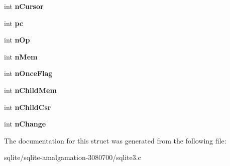 \begin{DoxyCompactItemize}
\item 
\hypertarget{struct_vdbe_frame_a9b74ca630c19ab905db3be4e78dbd9e1}{int {\bfseries n\+Cursor}}\label{struct_vdbe_frame_a9b74ca630c19ab905db3be4e78dbd9e1}

\item 
\hypertarget{struct_vdbe_frame_aed0e6d8cb1908580a3c2aca04516b46c}{int {\bfseries pc}}\label{struct_vdbe_frame_aed0e6d8cb1908580a3c2aca04516b46c}

\item 
\hypertarget{struct_vdbe_frame_acffd5d53fbb5cb55e257c34a547c1762}{int {\bfseries n\+Op}}\label{struct_vdbe_frame_acffd5d53fbb5cb55e257c34a547c1762}

\item 
\hypertarget{struct_vdbe_frame_ab340f2b5f6d6e09a872f5f8a64fec245}{int {\bfseries n\+Mem}}\label{struct_vdbe_frame_ab340f2b5f6d6e09a872f5f8a64fec245}

\item 
\hypertarget{struct_vdbe_frame_a04707991a2907a48a1c3b76f3da4d26b}{int {\bfseries n\+Once\+Flag}}\label{struct_vdbe_frame_a04707991a2907a48a1c3b76f3da4d26b}

\item 
\hypertarget{struct_vdbe_frame_a833bdf519676567bc3a700cdedc6562d}{int {\bfseries n\+Child\+Mem}}\label{struct_vdbe_frame_a833bdf519676567bc3a700cdedc6562d}

\item 
\hypertarget{struct_vdbe_frame_a2d2900348092258d12eb71057812429a}{int {\bfseries n\+Child\+Csr}}\label{struct_vdbe_frame_a2d2900348092258d12eb71057812429a}

\item 
\hypertarget{struct_vdbe_frame_a77aacb67d627f4446dd50a795b5a2f0f}{int {\bfseries n\+Change}}\label{struct_vdbe_frame_a77aacb67d627f4446dd50a795b5a2f0f}

\end{DoxyCompactItemize}


The documentation for this struct was generated from the following file\+:\begin{DoxyCompactItemize}
\item 
sqlite/sqlite-\/amalgamation-\/3080700/sqlite3.\+c\end{DoxyCompactItemize}
